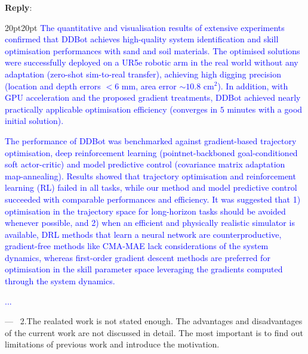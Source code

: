 \documentclass[11pt]{article}
\newcounter{reviewer}
\newcounter{point}[reviewer]
\renewcommand{\thepoint}{P\,\thereviewer.\arabic{point}}
\newenvironment{point}
   {\refstepcounter{point} \bigskip \noindent {\textbf{Reviewer~Point~\thepoint} } ---\ }
   {\par }
\newenvironment{reply}
   {\medskip \noindent \begin{sf}\textbf{Reply}: \  }
   {\medskip \end{sf}}
\newcommand{\xt}[1]{\textcolor{blue}{#1}}
\begin{document}
\begin{reply}
\begin{adjustwidth}{20pt}{20pt}
\xt{The quantitative and visualisation results of extensive experiments confirmed that DDBot achieves high-quality system identification and skill optimisation performances with sand and soil materials. The optimised solutions were successfully deployed on a UR5e robotic arm in the real world without any adaptation (zero-shot sim-to-real transfer), achieving high digging precision (location and depth errors $<6$ mm, area error $\sim10.8$ cm$^2$). In addition, with GPU acceleration and the proposed gradient treatments, DDBot achieved nearly practically applicable optimisation efficiency (converges in $5$ minutes with a good initial solution).} 

\xt{The performance of DDBot was benchmarked against gradient-based trajectory optimisation, deep reinforcement learning (pointnet-backboned goal-conditioned soft actor-critic) and model predictive control (covariance matrix adaptation map-annealing). Results showed that trajectory optimisation and reinforcement learning (RL) failed in all tasks, while our method and model predictive control succeeded with comparable performances and efficiency. It was suggested that 1) optimisation in the trajectory space for long-horizon tasks should be avoided whenever possible, and 2) when an efficient and physically realistic simulator is available, DRL methods that learn a neural network are counterproductive, gradient-free methods like CMA-MAE lack considerations of the system dynamics, whereas first-order gradient descent methods are preferred for optimisation in the skill parameter space leveraging the gradients computed through the system dynamics.}

\xt{...}

\end{adjustwidth}

\end{reply}

\begin{point}
2.The realated work is not stated enough. The advantages and disadvantages of the current work are not discussed in detail. The most important is to find out limitations of previous work and introduce the motivation. 
\end{point}
\end{document}
